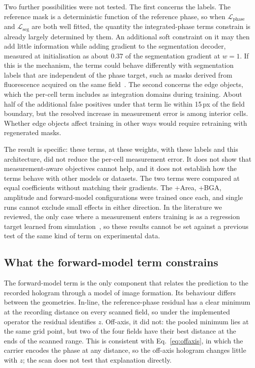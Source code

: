 \documentclass[11pt]{article}
\newcommand{\Lphase}{\mathcal{L}_\mathrm{phase}}
\newcommand{\Lseg}{\mathcal{L}_\mathrm{seg}}
\begin{document}
Two further possibilities were not tested. The first concerns the labels. The
reference mask is a deterministic function of the reference phase, so when
$\Lphase$ and $\Lseg$ are both well fitted, the quantity the integrated-phase
terms constrain is already largely determined by them. An additional soft
constraint on it may then add little information while adding gradient to the
segmentation decoder, measured at initialisation as about $0.37$ of the
segmentation gradient at $w=1$. If this is the mechanism, the terms could
behave differently with segmentation labels that are independent of the phase
target, such as masks derived from fluorescence acquired on the same
field~\cite{park2025holofluonet}. The second concerns the edge objects, which
the per-cell term includes as integration domains during training. About half of
the additional false positives under that term lie within 15\,px of the field
boundary, but the resolved increase in measurement error is among interior
cells. Whether edge objects affect training in other ways would require
retraining with regenerated masks.

The result is specific: these terms, at these weights, with these labels and
this architecture, did not reduce the per-cell measurement error. It does not
show that measurement-aware objectives cannot help, and it does not establish
how the terms behave with other models or datasets. The two terms were compared
at equal coefficients without matching their gradients. The +Area, +BGA,
amplitude and forward-model configurations were trained once each, and single
runs cannot exclude small effects in either direction. In the literature we
reviewed, the only case where a measurement enters training is as a regression
target learned from simulation~\cite{bachimanchi2022microplankton}, so these
results cannot be set against a previous test of the same kind of term on
experimental data.

\subsection{What the forward-model term constrains}
\label{sec:disc-fwd}

The forward-model term is the only component that relates the prediction to the
recorded hologram through a model of image formation. Its behaviour differs
between the geometries. In-line, the reference-phase residual has a clear
minimum at the recording distance on every scanned field, so under the
implemented operator the residual identifies $z$. Off-axis, it did not: the
pooled minimum lies at the same grid point, but two of the four fields have
their best distance at the ends of the scanned range. This is consistent with
Eq.~\eqref{eq:offaxis}, in which the carrier encodes the phase at any distance,
so the off-axis hologram changes little with $z$; the scan does not test that
explanation directly.
\end{document}
